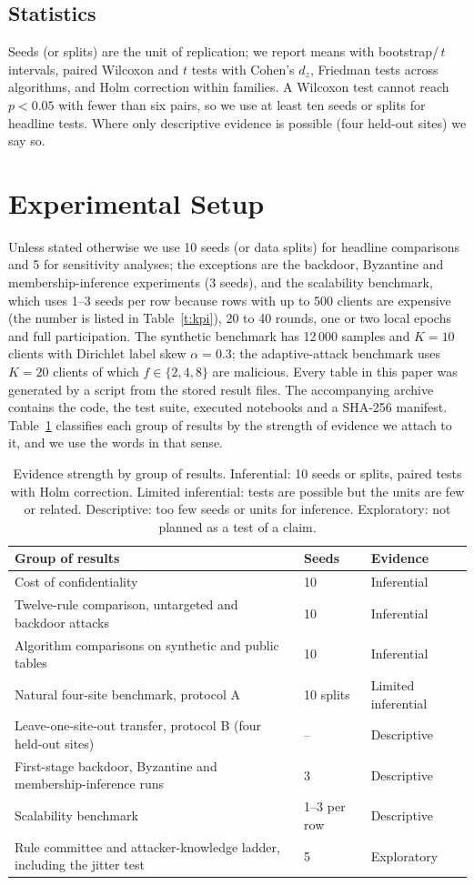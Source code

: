 \documentclass[conference]{IEEEtran}
\begin{document}
\subsection{Statistics}
Seeds (or splits) are the unit of replication; we report means with bootstrap/\,$t$ intervals, paired Wilcoxon and $t$ tests with Cohen's $d_z$, Friedman tests across algorithms, and Holm correction within families. A Wilcoxon test cannot reach $p<0.05$ with fewer than six pairs, so we use at least ten seeds or splits for headline tests. Where only descriptive evidence is possible (four held-out sites) we say so.
\section{Experimental Setup}
Unless stated otherwise we use 10 seeds (or data splits) for headline comparisons and 5 for sensitivity analyses; the exceptions are the backdoor, Byzantine and membership-inference experiments (3 seeds), and the scalability benchmark, which uses 1--3 seeds per row because rows with up to 500 clients are expensive (the number is listed in Table~\ref{t:kpi}), 20 to 40 rounds, one or two local epochs and full participation. The synthetic benchmark has 12\,000 samples and $K=10$ clients with Dirichlet label skew $\alpha=0.3$; the adaptive-attack benchmark uses $K=20$ clients of which $f\in\{2,4,8\}$ are malicious. Every table in this paper was generated by a script from the stored result files. The accompanying archive contains the code, the test suite, executed notebooks and a SHA-256 manifest. Table~\ref{t:ev} classifies each group of results by the strength of evidence we attach to it, and we use the words in that sense.
\begin{table}[t]\centering\caption{Evidence strength by group of results. Inferential: 10 seeds or splits, paired tests with Holm correction. Limited inferential: tests are possible but the units are few or related. Descriptive: too few seeds or units for inference. Exploratory: not planned as a test of a claim.}\label{t:ev}\scriptsize\setlength{\tabcolsep}{3pt}
\begin{tabular}{p{4.3cm}p{1.6cm}p{1.8cm}}\toprule
Group of results & Seeds & Evidence\\\midrule
Cost of confidentiality & 10 & Inferential\\
Twelve-rule comparison, untargeted and backdoor attacks & 10 & Inferential\\
Algorithm comparisons on synthetic and public tables & 10 & Inferential\\
Natural four-site benchmark, protocol A & 10 splits & Limited inferential\\
Leave-one-site-out transfer, protocol B (four held-out sites) & -- & Descriptive\\
First-stage backdoor, Byzantine and membership-inference runs & 3 & Descriptive\\
Scalability benchmark & 1--3 per row & Descriptive\\
Rule committee and attacker-knowledge ladder, including the jitter test & 5 & Exploratory\\\bottomrule\end{tabular}\end{table}
\end{document}
